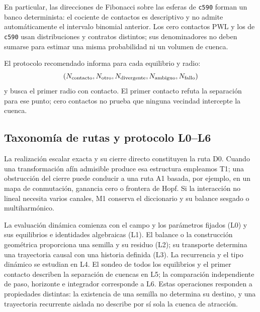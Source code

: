 En particular, las direcciones de Fibonacci sobre las esferas de
\texttt{c590} forman un banco determinista: el cociente de contactos es
descriptivo y no admite automáticamente el intervalo binomial anterior.
Los cero contactos PWL y los de \texttt{c590} usan distribuciones y contratos
distintos; sus denominadores no deben sumarse para estimar una misma
probabilidad ni un volumen de cuenca.

El protocolo recomendado informa para cada equilibrio y radio:
\[
 (N_{\rm contacto},N_{\rm otro},N_{\rm divergente},
 N_{\rm ambiguo},N_{\rm fallo})
\]
y busca el primer radio con contacto. El primer contacto refuta la separación
para ese punto; cero contactos no prueba que ninguna vecindad intercepte la
cuenca.
\fi

\subsection{Taxonomía de rutas y protocolo L0--L6}
\label{sec:l0-l6}

La realización escalar exacta y su cierre directo constituyen la ruta D0.
Cuando una transformación afín admisible produce esa estructura empleamos
T1; una obstrucción del cierre puede conducir a una ruta A1 basada, por
ejemplo, en un mapa de conmutación, ganancia cero o frontera de Hopf. Si la
interacción no lineal necesita varios canales, M1 conserva el diccionario y
su balance sesgado o multiharmónico.

La evaluación dinámica comienza con el campo y los parámetros fijados (L0)
y sus equilibrios e identidades algebraicas (L1). El balance o la
construcción geométrica proporciona una semilla y su residuo (L2); su
transporte determina una trayectoria causal con una historia definida (L3).
La recurrencia y el tipo dinámico se estudian en L4. El sondeo de todos los
equilibrios y el primer contacto describen la separación de cuencas en L5;
la comparación independiente de paso, horizonte e integrador corresponde a
L6. Estas operaciones responden a propiedades distintas: la existencia de
una semilla no determina su destino, y una trayectoria recurrente aislada
no describe por sí sola la cuenca de atracción.
